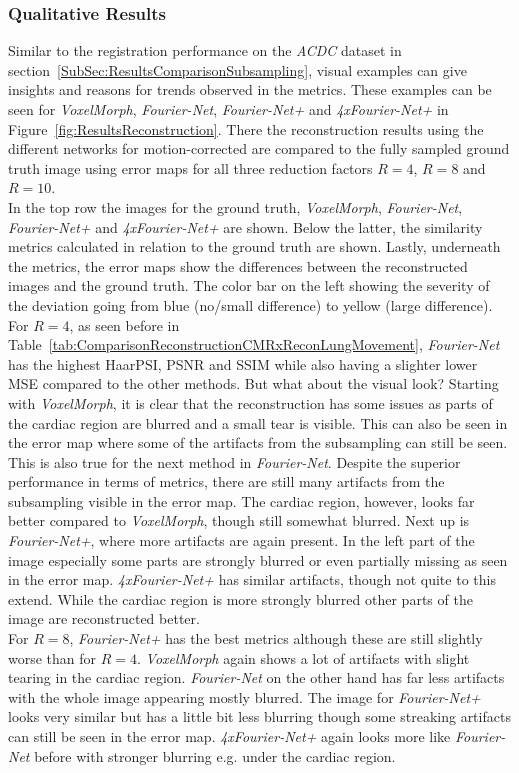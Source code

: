 \subsubsection{Qualitative Results}
Similar to the registration performance on the \emph{ACDC} dataset in section~\ref{SubSec:ResultsComparisonSubsampling}, visual examples can give insights and reasons for trends observed in the metrics. These examples can be seen for \emph{VoxelMorph}, \emph{Fourier-Net}, \emph{Fourier-Net+} and \emph{4xFourier-Net+} in Figure~\ref{fig:ResultsReconstruction}. There the reconstruction results using the different networks for motion-corrected are compared to the fully sampled ground truth image using error maps for all three reduction factors $R=4$, $R=8$ and $R=10$.\\
In the top row the images for the ground truth, \emph{VoxelMorph}, \emph{Fourier-Net}, \emph{Fourier-Net+} and \emph{4xFourier-Net+} are shown. Below the latter, the similarity metrics calculated in relation to the ground truth are shown. Lastly, underneath the metrics, the error maps show the differences between the reconstructed images and the ground truth. The color bar on the left showing the severity of the deviation going from blue (no/small difference) to yellow (large difference).\\
For $R=4$, as seen before in Table~\ref{tab:ComparisonReconstructionCMRxReconLungMovement}, \emph{Fourier-Net} has the highest HaarPSI, PSNR and SSIM while also having a slighter lower MSE compared to the other methods. But what about the visual look? Starting with \emph{VoxelMorph}, it is clear that the reconstruction has some issues as parts of the cardiac region are blurred and a small tear is visible. This can also be seen in the error map where some of the artifacts from the subsampling can still be seen. This is also true for the next method in \emph{Fourier-Net}. Despite the superior performance in terms of metrics, there are still many artifacts from the subsampling visible in the error map. The cardiac region, however, looks far better compared to \emph{VoxelMorph}, though still somewhat blurred. Next up is \emph{Fourier-Net+}, where more artifacts are again present. In the left part of the image especially some parts are strongly blurred or even partially missing as seen in the error map. \emph{4xFourier-Net+} has similar artifacts, though not quite to this extend. While the cardiac region is more strongly blurred other parts of the image are reconstructed better.\\
For $R=8$, \emph{Fourier-Net+} has the best metrics although these are still slightly worse than for $R=4$. \emph{VoxelMorph} again shows a lot of artifacts with slight tearing in the cardiac region. \emph{Fourier-Net} on the other hand has far less artifacts with the whole image appearing mostly blurred. The image for \emph{Fourier-Net+} looks very similar but has a little bit less blurring though some streaking artifacts can still be seen in the error map. \emph{4xFourier-Net+} again looks more like \emph{Fourier-Net} before with stronger blurring e.g. under the cardiac region.\\
